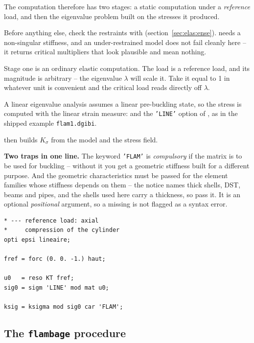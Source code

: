 The computation therefore has two stages: a static computation under a
\emph{reference} load, and then the eigenvalue problem built on the stresses
it produced.

\begin{castemcom}
Before anything else, check the restraints with 
(section~\ref{sec:elas:ense}).  needs a non-singular stiffness,
and an under-restrained model does not fail cleanly here -- it returns
critical multipliers that look plausible and mean nothing.

\medskip
Stage one is an ordinary elastic computation. The load is a reference load,
and its magnitude is arbitrary -- the eigenvalue $\lambda$ will scale it. Take
it equal to 1 in whatever unit is convenient and the critical load reads
directly off $\lambda$.

A linear eigenvalue analysis assumes a linear pre-buckling state, so the
stress is computed with the linear strain measure: 
and the \texttt{'LINE'} option of , as in the shipped example
\texttt{flam1.dgibi}.

  then builds
$K_{\sigma}$ from the model and the stress field.

\medskip
\textbf{Two traps in one line.} The keyword \texttt{'FLAM'} is
\emph{compulsory} if the matrix is to be used for buckling -- without it you
get a geometric stiffness built for a different purpose. And the geometric
characteristics  must be passed for the element families whose
stiffness depends on them -- the notice names thick shells, DST, beams and
pipes, and the shells used here carry a thickness, so pass it. It is an
optional \emph{positional} argument, so a missing  is not flagged as
a syntax error.
\end{castemcom}
\begin{castemlines}
\begin{verbatim}
* --- reference load: axial
*     compression of the cylinder
opti epsi lineaire;

fref = forc (0. 0. -1.) haut;

u0   = reso KT fref;
sig0 = sigm 'LINE' mod mat u0;

ksig = ksigma mod sig0 car 'FLAM';
\end{verbatim}
\end{castemlines}

\subsection{The \texttt{flambage} procedure}


